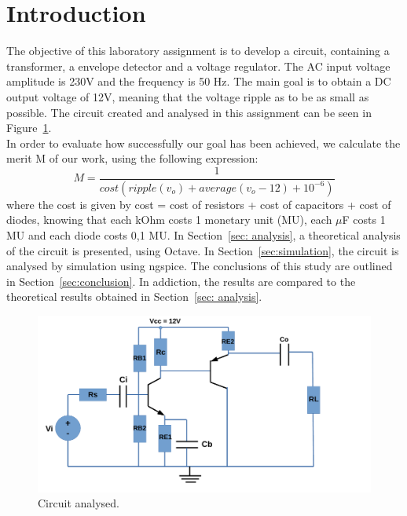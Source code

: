 \newpage
\section{Introduction}
\label{sec:introduction}

The objective of this laboratory assignment is to develop a circuit, containing a transformer, a envelope detector and a voltage regulator.
The AC input voltage amplitude is 230V and the frequency is 50 Hz. The main goal is to obtain a DC output voltage of 12V, 
meaning that the voltage ripple as to be as small as possible.
The circuit created and analysed in this assignment can be seen in Figure~\ref{fig:Circuit}.\\
In order to evaluate how successfully our goal has been achieved, we calculate the merit M of our work, using the following expression:
\begin{equation}
M = \frac{1}{cost(ripple(v_o) + average (v_o - 12) + 10^{-6})}
  \label{eq:merit}
\end{equation}
where the cost is given by cost = cost of resistors + cost of capacitors + cost of diodes, knowing that each kOhm costs 1 monetary unit (MU), 
each $\mu$F costs 1 MU and each diode costs 0,1 MU.
In Section~\ref{sec: analysis}, a theoretical analysis of the circuit is
presented, using Octave. In Section~\ref{sec:simulation}, the circuit is analysed by
simulation using ngspice. The conclusions of this study are outlined in
Section~\ref{sec:conclusion}. In addiction, the results are compared to the theoretical results obtained in
Section~\ref{sec: analysis}.

\begin{figure}[h!] \centering
\includegraphics[width=1\linewidth]{Circuit.pdf}
\caption{Circuit analysed.}
\label{fig:Circuit}
\end{figure}

